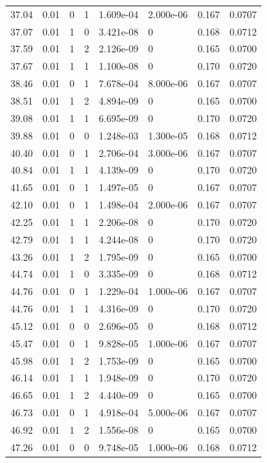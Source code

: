 \documentclass[preview]{standalone}
\begin{document}
{{{\begin{tabular}{L{1.2cm}C{1.2cm} C{0.3cm}C{0.5cm} C{1.4cm}C{1.4cm} C{1.4cm}C{1.4cm}}
  37.04  &  0.01  & 0     &  1 &  1.609e-04  & 2.000e-06  & 0.167 &  0.0707   \\ 
  37.07  &  0.01  & 1     &  0 &  3.421e-08  & 0  & 0.168 &  0.0712   \\ 
  37.59  &  0.01  & 1     &  2 &  2.126e-09  & 0  & 0.165 &  0.0700   \\ 
  37.67  &  0.01  & 1     &  1 &  1.100e-08  & 0  & 0.170 &  0.0720   \\ 
  38.46  &  0.01  & 0     &  1 &  7.678e-04  & 8.000e-06  & 0.167 &  0.0707   \\ 
  38.51  &  0.01  & 1     &  2 &  4.894e-09  & 0  & 0.165 &  0.0700   \\ 
  39.08  &  0.01  & 1     &  1 &  6.695e-09  & 0  & 0.170 &  0.0720   \\ 
  39.88  &  0.01  & 0     &  0 &  1.248e-03  & 1.300e-05  & 0.168 &  0.0712   \\ 
  40.40  &  0.01  & 0     &  1 &  2.706e-04  & 3.000e-06  & 0.167 &  0.0707   \\ 
  40.84  &  0.01  & 1     &  1 &  4.139e-09  & 0  & 0.170 &  0.0720   \\ 
  41.65  &  0.01  & 0     &  1 &  1.497e-05  & 0  & 0.167 &  0.0707   \\ 
  42.10  &  0.01  & 0     &  1 &  1.498e-04  & 2.000e-06  & 0.167 &  0.0707   \\ 
  42.25  &  0.01  & 1     &  1 &  2.206e-08  & 0  & 0.170 &  0.0720   \\ 
  42.79  &  0.01  & 1     &  1 &  4.244e-08  & 0  & 0.170 &  0.0720   \\ 
  43.26  &  0.01  & 1     &  2 &  1.795e-09  & 0  & 0.165 &  0.0700   \\ 
  44.74  &  0.01  & 1     &  0 &  3.335e-09  & 0  & 0.168 &  0.0712   \\ 
  44.76  &  0.01  & 0     &  1 &  1.229e-04  & 1.000e-06  & 0.167 &  0.0707   \\ 
  44.76  &  0.01  & 1     &  1 &  4.316e-09  & 0  & 0.170 &  0.0720   \\ 
  45.12  &  0.01  & 0     &  0 &  2.696e-05  & 0  & 0.168 &  0.0712   \\ 
  45.47  &  0.01  & 0     &  1 &  9.828e-05  & 1.000e-06  & 0.167 &  0.0707   \\ 
  45.98  &  0.01  & 1     &  2 &  1.753e-09  & 0  & 0.165 &  0.0700   \\ 
  46.14  &  0.01  & 1     &  1 &  1.948e-09  & 0  & 0.170 &  0.0720   \\ 
  46.65  &  0.01  & 1     &  2 &  4.440e-09  & 0  & 0.165 &  0.0700   \\ 
  46.73  &  0.01  & 0     &  1 &  4.918e-04  & 5.000e-06  & 0.167 &  0.0707   \\ 
  46.92  &  0.01  & 1     &  2 &  1.556e-08  & 0  & 0.165 &  0.0700   \\ 
  47.26  &  0.01  & 0     &  0 &  9.748e-05  & 1.000e-06  & 0.168 &  0.0712   \\ 
\hline 
\end{tabular} 

}}}
\end{document}
